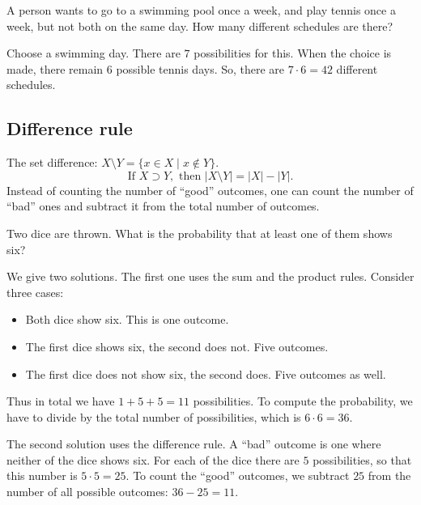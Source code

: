 \begin{page}
\setcounter{section}{1}
\setcounter{subsection}{2}
\setcounter{dfn}{2}
\label{portion:13}

\begin{exl}
A person wants to go to a swimming pool once a week, and play tennis once a week, but not both on the same day.
How many different schedules are there?

Choose a swimming day. There are $7$ possibilities for this.
When the choice is made, there remain $6$ possible tennis days.
So, there are $7 \cdot 6 = 42$ different schedules.
\end{exl}

\end{page}

\begin{page}
\setcounter{section}{1}
\setcounter{subsection}{3}
\setcounter{dfn}{2}
\label{portion:16}

\subsection{Difference rule}
The set difference: $X \setminus Y = \{x \in X \mid x \notin Y\}$.
\[
\text{If }X \supset Y, \text{ then } |X \setminus Y| = |X| - |Y|.
\]
Instead of counting the number of ``good'' outcomes,
one can count the number of ``bad'' ones and subtract it from the total number of outcomes.


\end{page}

\begin{page}
\setcounter{section}{1}
\setcounter{subsection}{3}
\setcounter{dfn}{3}
\label{portion:18}

\begin{exl}
Two dice are thrown. What is the probability that at least one of them shows six?

We give two solutions.
The first one uses the sum and the product rules.
Consider three cases:
\begin{itemize}
\item
Both dice show six. This is one outcome.
\item
The first dice shows six, the second does not. Five outcomes.
\item
The first dice does not show six, the second does. Five outcomes as well.
\end{itemize}
Thus in total we have $1+5+5=11$ possibilities.
To compute the probability, we have to divide by the total number of possibilities, which is $6 \cdot 6 = 36$.

The second solution uses the difference rule.
A ``bad'' outcome is one where neither of the dice shows six.
For each of the dice there are $5$ possibilities, so that this number is $5 \cdot 5 = 25$.
To count the ``good'' outcomes, we subtract $25$ from the number of all possible outcomes:
$36-25=11$.
\end{exl}

\end{page}

